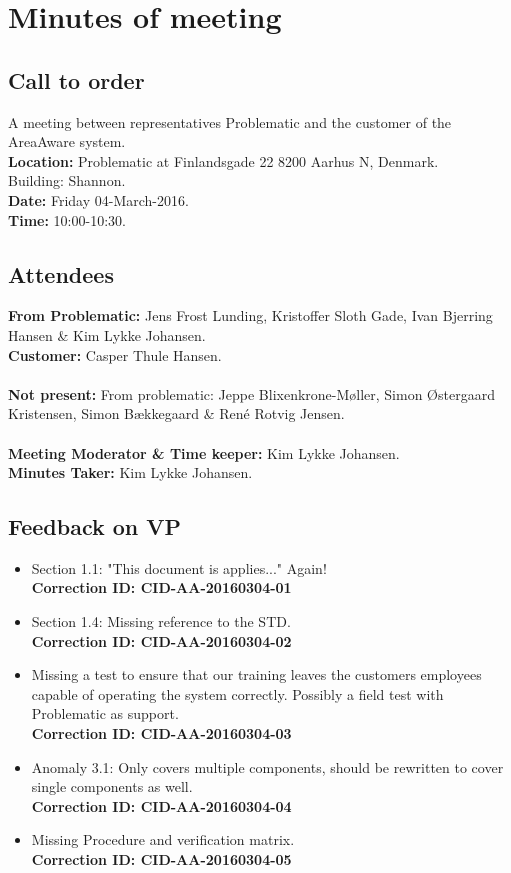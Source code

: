 %
\thispagestyle{fancy}
\chapter*{Minutes of meeting}


\section*{Call to order}
A meeting between representatives Problematic and the customer of the AreaAware system.\\
\textbf{Location:} Problematic at Finlandsgade 22 8200 Aarhus N, Denmark.\\ Building: Shannon.\\
\textbf{Date:} Friday 04-March-2016. \\
\textbf{Time:} 10:00-10:30.
\section*{Attendees}
\textbf{From Problematic:} Jens Frost Lunding, Kristoffer Sloth Gade, Ivan Bjerring Hansen \& Kim Lykke Johansen.\\
\textbf{Customer:} Casper Thule Hansen.\\\\
\textbf{Not present:} From problematic: Jeppe Blixenkrone-Møller, Simon Østergaard Kristensen, Simon Bækkegaard \& René Rotvig Jensen.\\\\
\textbf{Meeting Moderator \& Time keeper:} Kim Lykke Johansen. \\
\textbf{Minutes Taker:} Kim Lykke Johansen.

\section*{Feedback on VP}
\begin{itemize}
    \item Section 1.1: "This document is applies..." Again!
    \\ \textbf{Correction ID: CID-AA-20160304-01}
        
    \item Section 1.4: Missing reference to the STD.
    \\ \textbf{Correction ID: CID-AA-20160304-02}
    
    \item Missing a test to ensure that our training leaves the customers employees capable of operating the system correctly.
    Possibly a field test with Problematic as support.
    \\ \textbf{Correction ID: CID-AA-20160304-03}
    
    \item Anomaly 3.1: Only covers multiple components, should be rewritten to cover single components as well.
    \\ \textbf{Correction ID: CID-AA-20160304-04}
    
    \item Missing Procedure and verification matrix.
    \\ \textbf{Correction ID: CID-AA-20160304-05}
\end{itemize}

